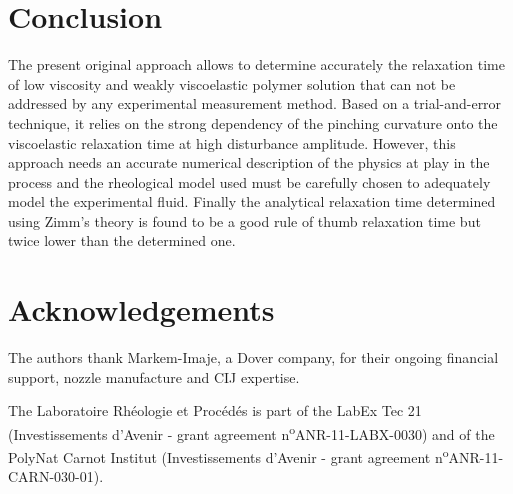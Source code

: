 \documentclass[onecolumn, 12pt]{asme2ej}
\begin{document}
\section{Conclusion}
The present original approach allows to determine accurately the relaxation time of low viscosity and weakly viscoelastic polymer solution that can not be addressed by any experimental measurement method. Based on a trial-and-error technique, it relies on the strong dependency of the pinching curvature onto the viscoelastic relaxation time at high disturbance amplitude. However, this approach needs an accurate numerical description of the physics at play in the process and the rheological model used must be carefully chosen to adequately model the experimental fluid. Finally the analytical relaxation time determined using Zimm's theory is found to be a good rule of thumb relaxation time but twice lower than the determined one. 
\section{Acknowledgements}
The authors thank Markem-Imaje\textcopyright, a {Dover\textregistered} company, for their ongoing financial support, nozzle manufacture and CIJ expertise.

The Laboratoire Rh\'eologie et Proc\'ed\'es is part of the LabEx Tec 21 (Investissements d'Avenir - grant agreement n\textsuperscript{o}ANR-11-LABX-0030) and of the PolyNat Carnot Institut (Investissements d'Avenir - grant agreement n\textsuperscript{o}ANR-11- CARN-030-01).


\end{document}
